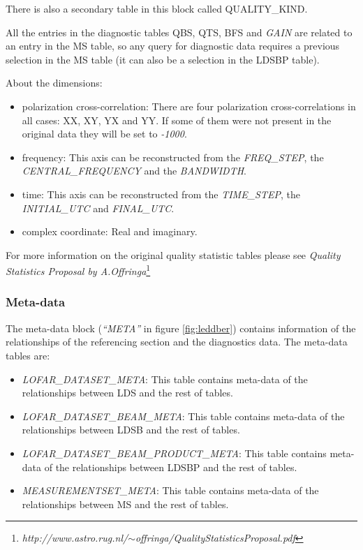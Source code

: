\documentclass[a4paper,11pt]{article}
\begin{document}
There is also a secondary table in this block called QUALITY\_KIND.

All the entries in the diagnostic tables QBS, QTS, BFS and \textit{GAIN} are related to an entry in the MS table, so any query for diagnostic data requires a previous selection in the MS table (it can also be a selection in the LDSBP table).  

About the dimensions:
\begin{itemize}
	\item polarization cross-correlation: There are four polarization cross-correlations in all cases: XX, XY, YX and YY. If some of them were not present in the original data they will be set to \textit{-1000}.
	
	\item frequency: This axis can be reconstructed from the \textit{FREQ\_STEP}, the \textit{CENTRAL\_FREQUENCY} and the \textit{BANDWIDTH}.
	
	\item time: This axis can be reconstructed from the \textit{TIME\_STEP}, the \textit{INITIAL\_UTC} and \textit{FINAL\_UTC}.
	
	\item complex coordinate: Real and imaginary.
\end{itemize} 

For more information on the original quality statistic tables please see \textit{Quality Statistics Proposal by A.Offringa}\footnote{{\it http://www.astro.rug.nl/$\sim$offringa/QualityStatisticsProposal.pdf}}

\subsubsection{Meta-data}
The meta-data block (\textit{``META''} in figure \ref{fig:leddber}) contains information of the relationships of the referencing section and the diagnostics data. The meta-data tables are:

\begin{itemize}
	\item \textit{LOFAR\_DATASET\_META}: This table contains meta-data of the relationships between LDS and the rest of tables.
	
	\item \textit{LOFAR\_DATASET\_BEAM\_META}: This table contains meta-data of the relationships between LDSB and the rest of tables.
	
	\item \textit{LOFAR\_DATASET\_BEAM\_PRODUCT\_META}: This table contains meta-data of the relationships between LDSBP and the rest of tables.
	
	\item \textit{MEASUREMENTSET\_META}: This table contains meta-data of the relationships between MS and the rest of tables.
\end{itemize}
\end{document}
